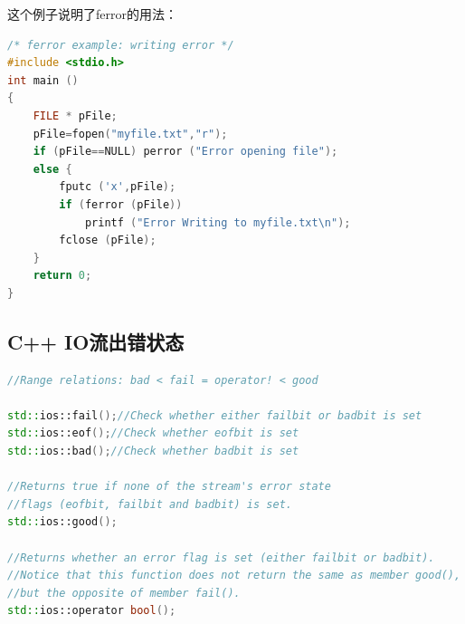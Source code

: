 这个例子说明了ferror的用法：
\begin{lstlisting}[language=C++]
/* ferror example: writing error */
#include <stdio.h>
int main ()
{
    FILE * pFile;
    pFile=fopen("myfile.txt","r");
    if (pFile==NULL) perror ("Error opening file");
    else {
        fputc ('x',pFile);
        if (ferror (pFile))
            printf ("Error Writing to myfile.txt\n");
        fclose (pFile);
    }   
    return 0;
}
\end{lstlisting} 



\subsection{C++ IO流出错状态}
\begin{lstlisting}[language=C++]
//Range relations: bad < fail = operator! < good

std::ios::fail();//Check whether either failbit or badbit is set
std::ios::eof();//Check whether eofbit is set
std::ios::bad();//Check whether badbit is set

//Returns true if none of the stream's error state 
//flags (eofbit, failbit and badbit) is set.
std::ios::good();

//Returns whether an error flag is set (either failbit or badbit).
//Notice that this function does not return the same as member good(), 
//but the opposite of member fail(). 
std::ios::operator bool();
\end{lstlisting}










